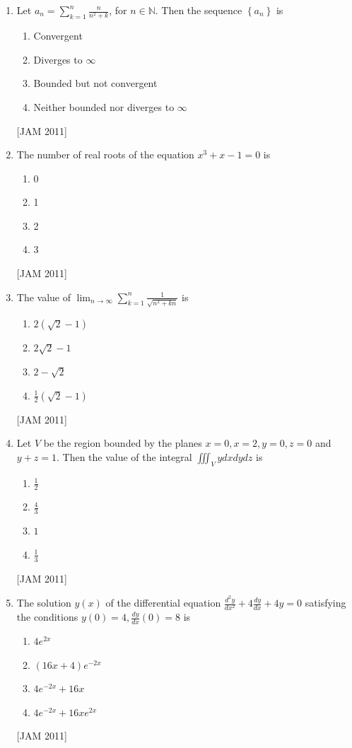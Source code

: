 \begin{enumerate}
    
\item  Let $a_{n}=\sum_{k=1}^{n} \frac{n}{n^{2}+k}$, for $n \in \mathbb{N}$. Then the sequence $\left\{a_{n}\right\}$ is 
\begin{enumerate}
    \item Convergent 
\item Diverges to $\infty$ 
\item Bounded but not convergent 
\item Neither bounded nor diverges to $\infty$
\end{enumerate}
\hfill [JAM 2011]




\item  The number of real roots of the equation $x^{3}+x-1=0$ is 

\begin{enumerate}
\item 0 
\item 1 
\item 2 
\item 3
\end{enumerate}
\hfill [JAM 2011]



\item  The value of $\lim _{n \rightarrow \infty} \sum_{k=1}^{n} \frac{1}{\sqrt{n^{2}+k n}}$ is 
\begin{enumerate}
    \item $2(\sqrt{2}-1)$ 
\item $2 \sqrt{2}-1$ 
\item $2-\sqrt{2}$ 
\item $\frac{1}{2}(\sqrt{2}-1)$
\end{enumerate}
\hfill [JAM 2011]




\item  Let $V$ be the region bounded by the planes $x=0, x=2, y=0, z=0$ and $y+z=1$. Then the value of the integral $\iiint_{V} y d x d y d z$ is 
\begin{enumerate}
    \item $\frac{1}{2}$ 
\item $\frac{4}{3}$ 
\item $1 $
\item $\frac{1}{3}$
\end{enumerate}
\hfill [JAM 2011]




\item  The solution $y(x)$ of the differential equation $\frac{d^{2} y}{d x^{2}}+4 \frac{d y}{d x}+4 y=0$ satisfying the conditions $y(0)=4, \frac{d y}{d x}(0)=8$ is 
\begin{enumerate}
    \item $4 e^{2 x}$ 
\item $(16 x+4) e^{-2 x}$ 
\item $4 e^{-2 x}+16 x$ 
\item $4 e^{-2 x}+16 x e^{2 x}$
\end{enumerate}
\hfill [JAM 2011]





\end{enumerate}
